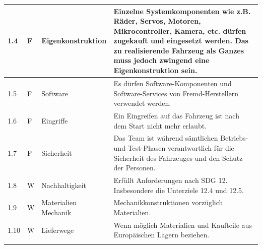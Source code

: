 \documentclass[../main.tex]{subfiles}
\begin{document}
\begin{tabular}{|l|p{0.5cm}|p{4cm}|p{10cm}|}
  \hline
  1.4          & F          & Eigenkonstruktion    & Einzelne Systemkomponenten wie z.B. Räder, Servos, Motoren, Mikrocontroller, Kamera, etc. dürfen zugekauft und eingesetzt werden. Das zu realisierende Fahrzeug als Ganzes muss jedoch zwingend eine Eigenkonstruktion sein. \\
  \hline
  1.5          & F          & Software             & Es dürfen Software-Komponenten und Software-Services von Fremd-Herstellern verwendet werden.                                                                                                                                 \\
  \hline
  1.6          & F          & Eingriffe            & Ein Eingreifen auf das Fahrzeug ist nach dem Start nicht mehr erlaubt.                                                                                                                                                       \\
  \hline
  1.7          & F          & Sicherheit           & Das Team ist während sämtlichen Betriebs- und Test-Phasen verantwortlich für die Sicherheit des Fahrzeuges und den Schutz der Personen.                                                                                      \\
  \hline
  1.8          & W          & Nachhaltigkeit       & Erfüllt Anforderungen nach SDG 12. Insbesondere die Unterziele 12.4 und 12.5.                                                                                                                                                \\
  \hline
  1.9          & W          & Materialien Mechanik & Mechanikkonstruktionen vorzüglich Materialien.                                                                                                                                                                               \\
  \hline
  1.10         & W          & Lieferwege           & Wenn möglich Materialien und Kaufteile aus Europäischen Lagern beziehen.                                                                                                                                                     \\                                                                                                               \\
  \hline
\end{tabular}
\end{document}
